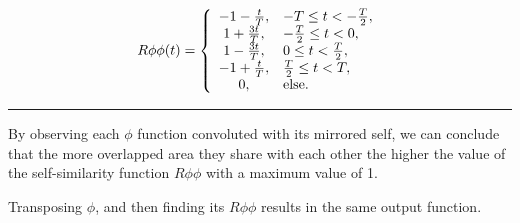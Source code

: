 \documentclass[12pt, a4paper]{article}
\begin{document}
\[R\phi\phi(t) =\left\{
\begin{array}{cl} 
-1 -\frac{t}{T}, & -T \le t < -\frac{T}{2},\cr
1 + \frac{3t}{T}, & -\frac{T}{2} \le t < 0, \cr
1 - \frac{3t}{T}, & 0 \le t < \frac{T}{2},\cr
-1 + \frac{t}{T}, & \frac{T}{2} \le t < T, \cr
0, & \mbox{else.}
\end{array} \right.
\]

\noindent\rule{\textwidth}{.5pt}
\par By observing each $\phi$ function convoluted with its mirrored self, we can conclude that the more overlapped area they share with each other the higher the value of the self-similarity function $R\phi\phi$ with a maximum value of 1. 
\par Transposing $\phi$, and then finding its $R\phi\phi$ results in the same output function.
\end{document}
